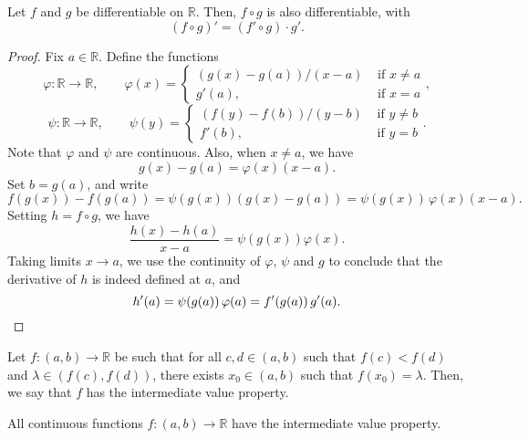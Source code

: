 \documentclass[11pt]{article}
\def\R{\mathbb{R}}
\theoremstyle{definition}
\theoremstyle{remark}
\numberwithin{equation}{module}
\begin{document}
    \begin{theorem}
        Let $f$ and $g$ be differentiable on $\R$. Then, $f\circ g$ is also
        differentiable, with \[
            (f\circ g)' = (f' \circ g)\cdot g'.
        \] 
    \end{theorem}
    \begin{proof}
        Fix $a \in \R$.
        Define the functions \[
            \varphi\colon \R \to \R, \qquad \varphi(x) = \begin{cases}
                (g(x) - g(a))/(x - a) &\text{ if }x \neq a\\
                g'(a), &\text{ if } x = a
            \end{cases},
        \] \[
            \psi\colon \R \to \R, \qquad \psi(y) = \begin{cases}
                (f(y) - f(b))/(y - b) &\text{ if }y \neq b\\
                f'(b), &\text{ if } y = b
            \end{cases}.
        \] Note that $\varphi$ and $\psi$ are continuous. Also, when $x \neq a$, we
        have \[
            g(x) - g(a) = \varphi(x)(x - a).
        \] Set $b = g(a)$, and write \[
            f(g(x)) - f(g(a)) = \psi(g(x))(g(x) - g(a)) = \psi(g(x))\,\varphi(x)(x -
            a).
        \] Setting $h = f\circ g$, we have \[
            \frac{h(x) - h(a)}{x - a} = \psi(g(x))\varphi(x).
        \] Taking limits $x \to a$, we use the continuity of $\varphi$, $\psi$ and
        $g$ to conclude that the derivative of $h$ is indeed defined at $a$, and \[
            h'(a) = \psi(g(a))\,\varphi(a) = f'(g(a))\,g'(a). \qedhere
        \] 
    \end{proof}

    \begin{definition}
        Let $f\colon (a, b) \to \R$ be such that for all $c, d \in (a, b)$ such that
        $f(c) < f(d)$ and $\lambda \in (f(c), f(d))$, there exists $x_0 \in (a, b)$ 
        such that $f(x_0) = \lambda$. Then, we say that $f$ has the intermediate
        value property.
    \end{definition}

    \begin{theorem}
        All continuous functions $f\colon (a, b) \to \R$ have the intermediate value
        property.
    \end{theorem}
\end{document}
